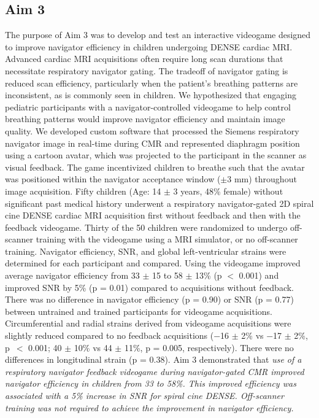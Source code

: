 \subsection{Aim 3}
	The purpose of Aim 3 was to develop and test an interactive videogame designed to improve navigator efficiency in children undergoing DENSE cardiac MRI. Advanced cardiac MRI acquisitions often require long scan durations that necessitate respiratory navigator gating. The tradeoff of navigator gating is reduced scan efficiency, particularly when the patient's breathing patterns are inconsistent, as is commonly seen in children. We hypothesized that engaging pediatric participants with a navigator-controlled videogame to help control breathing patterns would improve navigator efficiency and maintain image quality. We developed custom software that processed the Siemens respiratory navigator image in real-time during CMR and represented diaphragm position using a cartoon avatar, which was projected to the participant in the scanner as visual feedback. The game incentivized children to breathe such that the avatar was positioned within the navigator acceptance window ($\pm$3 mm) throughout image acquisition. Fifty children (Age: 14 $\pm$ 3 years, 48\% female) without significant past medical history underwent a respiratory navigator-gated 2D spiral cine DENSE cardiac MRI acquisition first without feedback and then with the feedback videogame. Thirty of the 50 children were randomized to undergo off-scanner training with the videogame using a MRI simulator, or no off-scanner training. Navigator efficiency, SNR, and global left-ventricular strains were determined for each participant and compared. Using the videogame improved average navigator efficiency from 33 $\pm$ 15 to 58 $\pm$ 13\% (p $<$ 0.001) and improved SNR by 5\% (p = 0.01) compared to acquisitions without feedback. There was no difference in navigator efficiency (p = 0.90) or SNR (p = 0.77) between untrained and trained participants for videogame acquisitions. Circumferential and radial strains derived from videogame acquisitions were slightly reduced compared to no feedback acquisitions (−16 $\pm$ 2\% vs −17 $\pm$ 2\%, p~$<$ 0.001; 40 $\pm$ 10\% vs 44 $\pm$ 11\%, p = 0.005, respectively). There were no differences in longitudinal strain (p = 0.38). Aim 3 demonstrated that \textit{use of a respiratory navigator feedback videogame during navigator-gated CMR improved navigator efficiency in children from 33 to 58\%. This improved efficiency was associated with a 5\% increase in SNR for spiral cine DENSE. Off-scanner training was not required to achieve the improvement in navigator efficiency.}

